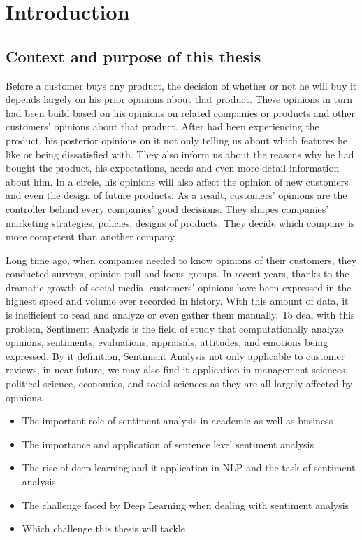 \chapter{Introduction}
\section{Context and purpose of this thesis}
Before a customer buys any product, the decision of whether or not he will buy it depends largely on his prior opinions about that product. 
These opinions in turn had been build based on his opinions on related companies or products and other customers' opinions about that product.  
After had been experiencing the product, his posterior opinions on it not only telling us about which features he like or being dissatisfied with.
They also inform us about the reasons why he had bought the product, his expectations, needs and even more detail information about him.
In a circle, his opinions will also affect the opinion of new customers and even the design of future products.
As a result, customers' opinions are the controller behind every companies' good decisions. 
They shapes companies' marketing strategies, policies, designs of products.
They decide which company is more competent than another company.

Long time ago, when companies needed to know opinions of their customers, they conducted surveys, opinion pull and focus groups\cite{liu2012sentiment}. 
In recent years, thanks to the dramatic growth of social media, customers' opinions have been expressed in the highest speed and volume ever recorded in history.
With this amount of data, it is inefficient to read and analyze or even gather them manually.
To deal with this problem, Sentiment Analysis is the field of study that computationally analyze opinions, sentiments, evaluations, appraisals, attitudes, and emotions being expressed\cite{liu2012sentiment}.
By it definition, Sentiment Analysis not only applicable to customer reviews, in near future, we may also find it application in management sciences, political science, economics, and social sciences as they are all largely affected by opinions\cite{liu2012sentiment}. 


\begin{itemize}
\item The important role of sentiment analysis in academic as well as business
\item The importance and application of sentence level sentiment analysis
\item The rise of deep learning and it application in NLP and the task of sentiment analysis
\item The challenge faced by Deep Learning when dealing with sentiment analysis
\item Which challenge this thesis will tackle
\end{itemize}

